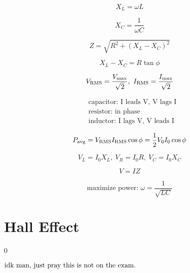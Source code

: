 \documentclass[12pt]{article}
\begin{document}
\begin{equation}
	X_L = \omega L
\end{equation}

\begin{equation}
	X_C = \dfrac 1 {\omega C}
\end{equation}

\begin{equation}
	Z = \sqrt{R^2 + (X_L - X_C)^2}
\end{equation}

\begin{equation}
	X_L - X_C = R \tan \phi
\end{equation}

\begin{equation}
	V_{\rm RMS} = \dfrac {V_{\rm max}} {\sqrt 2}, ~
	I_{\rm RMS} = \dfrac {I_{\rm max}} {\sqrt 2}
\end{equation}

\begin{align*}
	& \text{capacitor: I leads V, V lags I} \\
	& \text{resistor: in phase} \\
	& \text{inductor: I lags V, V leads I}
\end{align*}

\begin{equation}
	P_{\rm avg} = V_{\rm RMS} I_{\rm RMS} \cos \phi = \dfrac 1 2 V_0 I_0 \cos \phi
\end{equation}

\begin{equation}
	V_L = I_0 X_L, ~ V_R = I_0 R, ~ V_C = I_0 X_C
\end{equation}

\begin{equation}
	V = I Z
\end{equation}

\begin{equation}
	\text{maximize power: } \omega = \dfrac 1 {\sqrt{LC}}
\end{equation}

\section{Hall Effect} \setcounter {equation} 0

$\hfill \text{idk man, just pray this is not on the exam.} \hfill$
\end{document}
